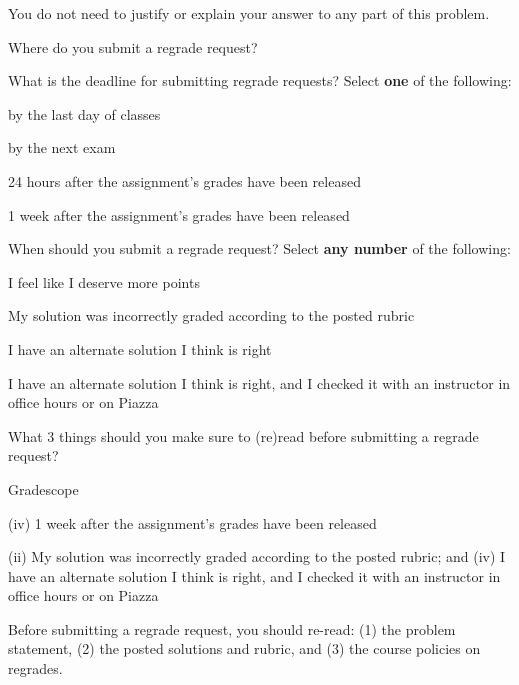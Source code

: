 \documentclass[12pt]{exam}
\begin{document}
You do not need to justify or explain your answer to any part of this problem.
\begin{qparts}
    \item Where do you submit a regrade request?

    \item What is the deadline for submitting regrade requests? Select \textbf{one} of the following:
    \begin{qsubparts}
        \item by the last day of classes
        \item by the next exam
        \item 24 hours after the assignment's grades have been released
        \item 1 week after the assignment's grades have been released
    \end{qsubparts}

    \item When should you submit a regrade request? Select \textbf{any number} of the following:
    \begin{qsubparts}
        \item I feel like I deserve more points
        \item My solution was incorrectly graded according to the posted rubric
        \item I have an alternate solution I think is right
        \item I have an alternate solution I think is right, and I checked it with an instructor in office hours or on Piazza
    \end{qsubparts}
    \item What 3 things should you make sure to (re)read before submitting a regrade request?
\end{qparts}

\begin{solution}
\begin{qparts}
    \item Gradescope
    \item (iv) 1 week after the assignment's grades have been released
    \item (ii) My solution was incorrectly graded according to the posted rubric; and (iv) I have an alternate solution I think is right, and I checked it with an instructor in office hours or on Piazza
    \item Before submitting a regrade request, you should re-read: (1) the problem statement, (2) the posted solutions and rubric, and (3) the course policies on regrades.
\end{qparts}
\end{solution}
\end{document}
